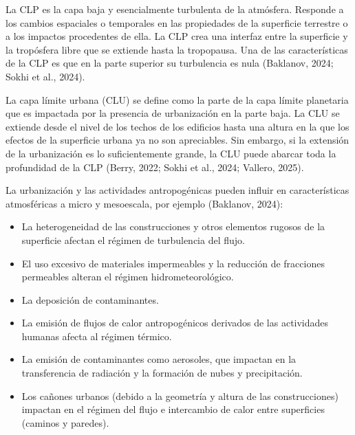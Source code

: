 
La CLP es la capa baja y esencialmente
turbulenta de la atmósfera. Responde a los cambios espaciales o
temporales en las propiedades de la superficie terrestre o a los
impactos procedentes de ella. La CLP crea una interfaz entre la
superficie y la tropósfera libre que se extiende hasta la tropopausa.
Una de las características de la CLP es que en la parte superior su
turbulencia es nula (Baklanov, 2024; Sokhi et al., 2024).


La capa límite urbana (CLU) se define como la parte de la capa límite
planetaria que es impactada por la presencia de urbanización en la
parte baja. La CLU se extiende desde el nivel de los techos de los
edificios hasta una altura en la que los efectos de la superficie
urbana ya no son apreciables. Sin embargo, si la extensión de la
urbanización es lo suficientemente grande, la CLU puede abarcar toda la
profundidad de la CLP (Berry, 2022; Sokhi et al., 2024; Vallero, 2025).

La urbanización y las actividades antropogénicas pueden influir en
características atmosféricas a micro y mesoescala, por ejemplo
(Baklanov, 2024):

\begin{itemize}
    \item La heterogeneidad de las construcciones y otros elementos
    rugosos de la superficie afectan el régimen de turbulencia del
    flujo.
    
    \item El uso excesivo de materiales impermeables y la reducción de
    fracciones permeables alteran el régimen hidrometeorológico.
    
    \item La deposición de contaminantes.
    
    \item La emisión de flujos de calor antropogénicos derivados de las
    actividades humanas afecta al régimen térmico.
    
    \item La emisión de contaminantes como aerosoles, que impactan en la
    transferencia de radiación y la formación de nubes y precipitación.
    
    \item Los cañones urbanos (debido a la geometría y altura de las
    construcciones) impactan en el régimen del flujo e intercambio de
    calor entre superficies (caminos y paredes).
\end{itemize}

